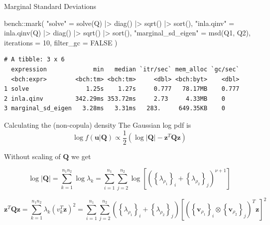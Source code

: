 \documentclass[
  ignorenonframetext,
]{beamer}
\newenvironment{Shaded}{\begin{snugshade}}{\end{snugshade}}
\newcommand{\AttributeTok}[1]{\textcolor[rgb]{0.40,0.45,0.13}{#1}}
\newcommand{\ConstantTok}[1]{\textcolor[rgb]{0.56,0.35,0.01}{#1}}
\newcommand{\DecValTok}[1]{\textcolor[rgb]{0.68,0.00,0.00}{#1}}
\newcommand{\FunctionTok}[1]{\textcolor[rgb]{0.28,0.35,0.67}{#1}}
\newcommand{\NormalTok}[1]{\textcolor[rgb]{0.00,0.23,0.31}{#1}}
\newcommand{\OtherTok}[1]{\textcolor[rgb]{0.00,0.23,0.31}{#1}}
\newcommand{\SpecialCharTok}[1]{\textcolor[rgb]{0.37,0.37,0.37}{#1}}
\newcommand{\StringTok}[1]{\textcolor[rgb]{0.13,0.47,0.30}{#1}}
\begin{document}
\begin{frame}[fragile]{Marginal Standard Deviations}
\begin{Shaded}
\begin{Highlighting}[]
\NormalTok{bench}\SpecialCharTok{::}\FunctionTok{mark}\NormalTok{(}
  \StringTok{"solve"} \OtherTok{=} \FunctionTok{solve}\NormalTok{(Q) }\SpecialCharTok{|\textgreater{}} \FunctionTok{diag}\NormalTok{() }\SpecialCharTok{|\textgreater{}} \FunctionTok{sqrt}\NormalTok{() }\SpecialCharTok{|\textgreater{}} \FunctionTok{sort}\NormalTok{(),}
  \StringTok{"inla.qinv"} \OtherTok{=} \FunctionTok{inla.qinv}\NormalTok{(Q) }\SpecialCharTok{|\textgreater{}} \FunctionTok{diag}\NormalTok{() }\SpecialCharTok{|\textgreater{}} \FunctionTok{sqrt}\NormalTok{() }\SpecialCharTok{|\textgreater{}} \FunctionTok{sort}\NormalTok{(),}
  \StringTok{"marginal\_sd\_eigen"} \OtherTok{=} \FunctionTok{msd}\NormalTok{(Q1, Q2),}
  \AttributeTok{iterations =} \DecValTok{10}\NormalTok{,}
  \AttributeTok{filter\_gc =} \ConstantTok{FALSE}
\NormalTok{)}
\end{Highlighting}
\end{Shaded}

\begin{verbatim}
# A tibble: 3 x 6
  expression             min   median `itr/sec` mem_alloc `gc/sec`
  <bch:expr>        <bch:tm> <bch:tm>     <dbl> <bch:byt>    <dbl>
1 solve                1.25s    1.27s     0.777   78.17MB    0.777
2 inla.qinv         342.29ms 353.72ms     2.73     4.33MB    0    
3 marginal_sd_eigen   3.28ms   3.31ms   283.     649.35KB    0    
\end{verbatim}
\end{frame}

\begin{frame}{Calculating the (non-copula) density}
\label{calculating-the-non-copula-density}
The Gaussian log pdf is \[
\log f(\mathbf{u} \vert \mathbf{Q}) \propto \frac{1}{2}\left(\log|\mathbf{Q}| - \mathbf{z}^T\mathbf{Q}\mathbf{z}\right)
\]

Without scaling of \(\mathbf Q\) we get

\[
\log|\mathbf{Q}| = \sum_{k=1}^{n_1n_2}\log\lambda_k = \sum_{i=1}^{n_1}\sum_{j=2}^{n_2} \log\left[\left(\left\{\lambda_{\rho_1}\right\}_i + \left\{\lambda_{\rho_2}\right\}_j\right)^{\nu + 1}\right]
\]

\[
\mathbf{z}^T\mathbf{Q}\mathbf{z} = \sum_{k=1}^{n_1n_2}\lambda_k \left(v_k^T\mathbf z\right)^2 = 
\sum_{i=1}^{n_1}\sum_{j=2}^{n_2} 
\left(\left\{\lambda_{\rho_1}\right\}_i + \left\{\lambda_{\rho_2}\right\}_j\right)
\left[\left(\left\{\mathbf{v}_{\rho_1}\right\}_i \otimes \left\{\mathbf{v}_{\rho_2}\right\}_j\right)^T\mathbf z\right]^2
\]
\end{frame}
\end{document}
